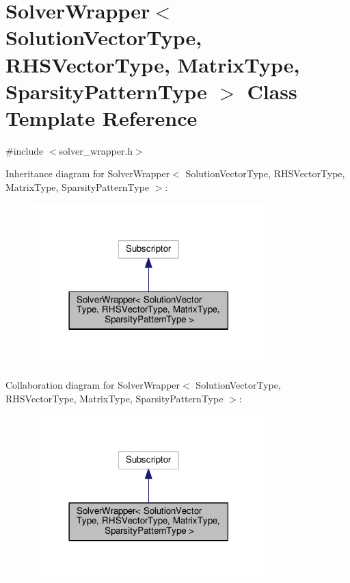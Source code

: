 \hypertarget{class_solver_wrapper}{}\section{Solver\+Wrapper$<$ Solution\+Vector\+Type, R\+H\+S\+Vector\+Type, Matrix\+Type, Sparsity\+Pattern\+Type $>$ Class Template Reference}
\label{class_solver_wrapper}


{\ttfamily \#include $<$solver\+\_\+wrapper.\+h$>$}



Inheritance diagram for Solver\+Wrapper$<$ Solution\+Vector\+Type, R\+H\+S\+Vector\+Type, Matrix\+Type, Sparsity\+Pattern\+Type $>$\+:\nopagebreak
\begin{figure}[H]
\begin{center}
\leavevmode
\includegraphics[width=254pt]{class_solver_wrapper__inherit__graph}
\end{center}
\end{figure}


Collaboration diagram for Solver\+Wrapper$<$ Solution\+Vector\+Type, R\+H\+S\+Vector\+Type, Matrix\+Type, Sparsity\+Pattern\+Type $>$\+:\nopagebreak
\begin{figure}[H]
\begin{center}
\leavevmode
\includegraphics[width=254pt]{class_solver_wrapper__coll__graph}
\end{center}
\end{figure}

